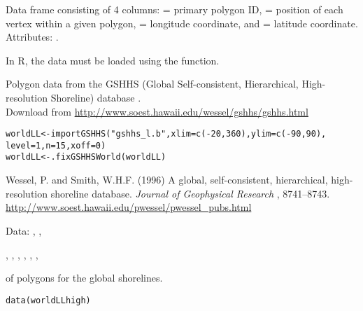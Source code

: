 \documentclass[letterpaper]{book}
\begin{document}
%
\begin{Format}
Data frame consisting of 4 columns:  = primary polygon ID,
 = position of each vertex within a given polygon, 
= longitude coordinate, and  = latitude coordinate. Attributes:
.
\end{Format}
%
\begin{Note}\relax
In R, the data must be loaded using the  function.
\end{Note}
%
\begin{Source}\relax
Polygon data from the GSHHS (Global Self-consistent, Hierarchical,
High-resolution Shoreline) database . \\{}
Download from \url{http://www.soest.hawaii.edu/wessel/gshhs/gshhs.html}

\begin{alltt}
worldLL <-importGSHHS("gshhs_l.b", xlim=c(-20,360), ylim=c(-90,90), 
                      level=1, n=15, xoff=0)
worldLL <- .fixGSHHSWorld(worldLL)
\end{alltt}

\end{Source}
%
\begin{References}\relax
Wessel, P. and Smith, W.H.F. (1996) A global, self-consistent,
hierarchical, high-resolution shoreline database. \emph{Journal of
Geophysical Research} , 8741--8743. \\{}
\url{http://www.soest.hawaii.edu/pwessel/pwessel_pubs.html}
\end{References}
%
\begin{SeeAlso}\relax
Data:  , , 

, , ,
, , ,
\end{SeeAlso}
%
\begin{Description}\relax
{} of polygons for the global shorelines.
\end{Description}
%
\begin{Usage}
\begin{verbatim}
data(worldLLhigh)
\end{verbatim}
\end{Usage}
\end{document}
